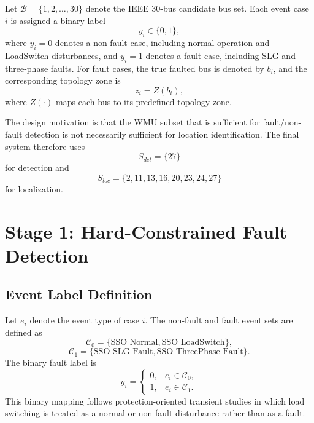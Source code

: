 \documentclass[conference]{IEEEtran}
\begin{document}
Let $\mathcal{B}=\{1,2,\ldots,30\}$ denote the IEEE 30-bus candidate bus set. Each event case $i$ is assigned a binary label
\begin{equation}
y_i\in\{0,1\},
\end{equation}
where $y_i=0$ denotes a non-fault case, including normal operation and LoadSwitch disturbances, and $y_i=1$ denotes a fault case, including SLG and three-phase faults. For fault cases, the true faulted bus is denoted by $b_i$, and the corresponding topology zone is
\begin{equation}
z_i=Z(b_i),
\end{equation}
where $Z(\cdot)$ maps each bus to its predefined topology zone.

The design motivation is that the WMU subset that is sufficient for fault/non-fault detection is not necessarily sufficient for location identification. The final system therefore uses
\begin{equation}
S_{det}=\{27\}
\end{equation}
for detection and
\begin{equation}
S_{loc}=\{2,11,13,16,20,23,24,27\}
\end{equation}
for localization.

\section{Stage 1: Hard-Constrained Fault Detection}

\subsection{Event Label Definition}

Let $e_i$ denote the event type of case $i$. The non-fault and fault event sets are defined as
\begin{equation}
\mathcal{C}_0=\{\mathrm{SSO\_Normal},\mathrm{SSO\_LoadSwitch}\},
\end{equation}
\begin{equation}
\mathcal{C}_1=\{\mathrm{SSO\_SLG\_Fault},\mathrm{SSO\_ThreePhase\_Fault}\}.
\end{equation}
The binary fault label is
\begin{equation}
y_i=\begin{cases}
0, & e_i\in\mathcal{C}_0,\\
1, & e_i\in\mathcal{C}_1.
\end{cases}
\end{equation}
This binary mapping follows protection-oriented transient studies in which load switching is treated as a normal or non-fault disturbance rather than as a fault.
\end{document}
